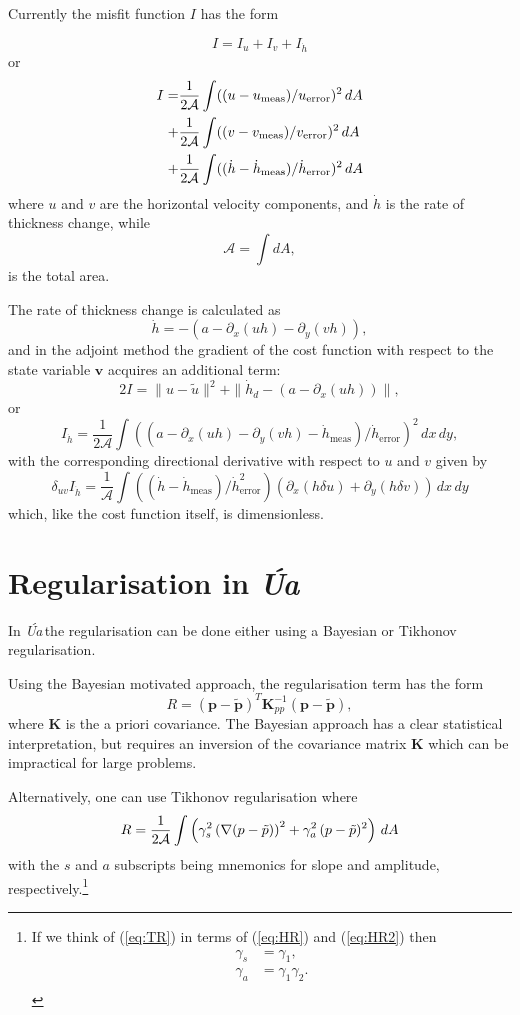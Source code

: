 \documentclass[10pt,a4paper]{book}
\newcommand{\p}{\partial}
\newcommand{\Ua}{\textsl{\'Ua}\,}
\begin{document}
Currently the misfit function $I$ has the form

\[
  I=I_u+I_v+I_{\dot{h}}
\]
or
\begin{align*}
I =&  \frac{1}{2\cal{A}} \int  ((u-u_{\mathrm{meas}})/u_{\mathrm{error}})^2 \, dA \\
   +&  \frac{1}{2\cal{A}} \int  ((v-v_{\mathrm{meas}})/v_{\mathrm{error}})^2 \, dA \\
   +& \frac{1}{2\cal{A}} \int  ((\dot{h} - \dot{h}_{\mathrm{meas}})/\dot{h}_{\mathrm{error}} )^2  \, dA \\
\end{align*}
where $u$ and $v$ are the horizontal velocity components, and
$\dot{h}$ is the rate of thickness change, while
\[
\mathcal{A}= \int dA,
\]
is the total area.


The rate of thickness change is calculated as
\[
\dot{h}=- ( a - \p_x (uh) - \p_y (vh )),
\]
and in the adjoint method the gradient of the cost function with
respect to the state variable $\mathbf{v}$ acquires an additional
term:
\[
 2 I =\| u - \tilde{u} \|^2 +  \| \dot{h}_d - ( a - \p_x (uh) ) \|,
\]
or
\[
I_{\dot{h}}= \frac{1}{2 \mathcal{A}} \int \left ( ( a - \p_x (uh) - \p_y (vh ) - \dot{h}_{\mathrm{meas}})/\dot{h}_{\mathrm{error}} \right )^2 \, dx \, dy,
\]
with the corresponding directional derivative with respect to $u$ and $v$ given by
\[
\delta_{uv} I_{\dot{h}}= \frac{1}{\mathcal{A}} \int \left ((\dot{h}-\dot{h}_{\mathrm{meas}})/\dot{h}^2_{\mathrm{error}} \right )  \left ( \p_x ( h \delta u) + \p_y ( h \delta v) \right ) \, dx \, dy
\]
which, like the cost function itself, is dimensionless.


\section{Regularisation in \Ua}

In \Ua the regularisation can be done either using a Bayesian or
Tikhonov regularisation. 


Using the Bayesian motivated approach, the regularisation term has the form
\begin{equation}
R=(\bm{p}-\tilde{\bm{p}})^T \bm{K}^{-1}_{pp} (\bm{p}-\tilde{\bm{p}}),
\label{eq:BR}
\end{equation}
where $\bm{K}$ is the a priori covariance. The Bayesian approach has a
clear statistical interpretation, but requires an inversion of the
covariance matrix $\bm{K}$ which can be impractical for large problems.

Alternatively, one can use Tikhonov regularisation where
\begin{equation}
R=  \frac{1}{2\cal{A}} \int \left ( \gamma_s^2   \left ( \nabla( p - \tilde{p}) \right )^2 + \gamma_a^2 \, (p-\tilde{p})^2 \right ) \, dA
\label{eq:TR}
\end{equation}
with the $s$ and $a$ subscripts being mnemonics for slope and
amplitude, respectively.\footnote{If we think of (\ref{eq:TR}) in terms of (\ref{eq:HR}) and (\ref{eq:HR2}) then
\begin{align*}
\gamma_s & =\gamma_1 ,\\
\gamma_a &=\gamma_1  \gamma_2  .\\
\end{align*}}
\end{document}
